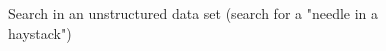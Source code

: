\begin{figure}
\centering



\caption{Search in an unstructured data set (search for a "needle in
  a haystack")}
\label{figQuantCompSearch}
\end{figure}
